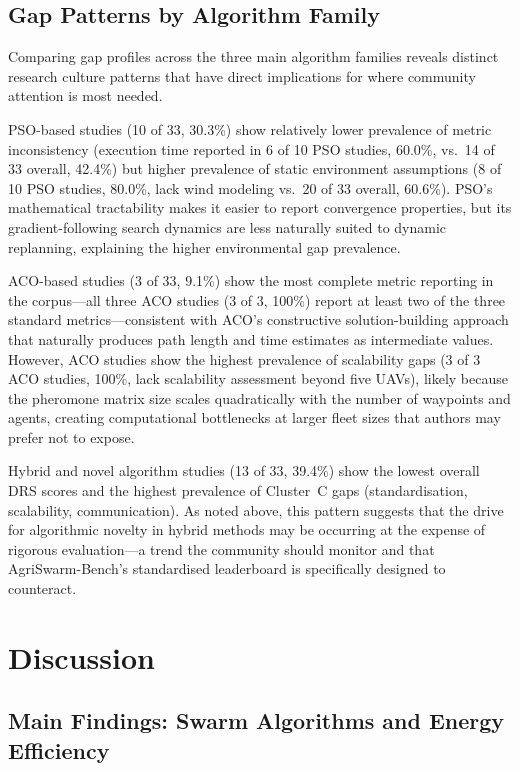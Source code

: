 \documentclass[review,3p,times]{elsarticle}
\begin{document}
\subsection{Gap Patterns by Algorithm Family}

Comparing gap profiles across the three main algorithm families reveals distinct research culture patterns that have direct implications for where community attention is most needed.

PSO-based studies (10 of 33, 30.3\%) show relatively lower prevalence of metric inconsistency (execution time reported in 6 of 10 PSO studies, 60.0\%, vs.\ 14 of 33 overall, 42.4\%) but higher prevalence of static environment assumptions (8 of 10 PSO studies, 80.0\%, lack wind modeling vs.\ 20 of 33 overall, 60.6\%). PSO's mathematical tractability makes it easier to report convergence properties, but its gradient-following search dynamics are less naturally suited to dynamic replanning, explaining the higher environmental gap prevalence.

ACO-based studies (3 of 33, 9.1\%) show the most complete metric reporting in the corpus---all three ACO studies (3 of 3, 100\%) report at least two of the three standard metrics---consistent with ACO's constructive solution-building approach that naturally produces path length and time estimates as intermediate values. However, ACO studies show the highest prevalence of scalability gaps (3 of 3 ACO studies, 100\%, lack scalability assessment beyond five UAVs), likely because the pheromone matrix size scales quadratically with the number of waypoints and agents, creating computational bottlenecks at larger fleet sizes that authors may prefer not to expose.

Hybrid and novel algorithm studies (13 of 33, 39.4\%) show the lowest overall DRS scores and the highest prevalence of Cluster~C gaps (standardisation, scalability, communication). As noted above, this pattern suggests that the drive for algorithmic novelty in hybrid methods may be occurring at the expense of rigorous evaluation---a trend the community should monitor and that AgriSwarm-Bench's standardised leaderboard is specifically designed to counteract.


\section{Discussion}
\label{sec:discussion}

\subsection{Main Findings: Swarm Algorithms and Energy Efficiency}
\end{document}
